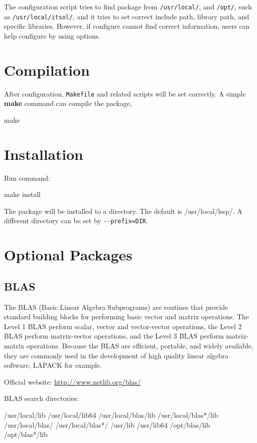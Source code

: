 The configuration script tries to find package from \verb|/usr/local/|, and \verb|/opt/|,
such as \verb|/usr/local/itsol/|, and it tries to set correct include path, library path, and 
specific libraries. However, if configure cannot find correct information, 
users can help configure by using options.

\section{Compilation}
After configuration, \verb|Makefile| and related scripts will be set correctly.
A simple {\color{blue}\textbf{make}} command can compile the package,

\begin{evb}
make
\end{evb}

\section{Installation}
Run command:
\begin{evb}
make install
\end{evb}
The package will be installed to a directory. The default is /usr/local/lssp/. 
A different directory can be set by \verb|--prefix=DIR|.

\section{Optional Packages}

\subsection{BLAS}
The BLAS (Basic Linear Algebra Subprograms) are routines that provide standard building blocks for performing basic vector and matrix operations. The Level 1 BLAS perform scalar, vector and vector-vector operations, the Level 2 BLAS perform matrix-vector operations, and the Level 3 BLAS perform matrix-matrix operations. Because the BLAS are efficient, portable, and widely available, they are commonly used in the development of high quality linear algebra software, LAPACK for example.

Official website: \url{http://www.netlib.org/blas/}

BLAS search directories:
\begin{evb}
/usr/local/lib
/usr/local/lib64
/usr/local/blas/lib
/usr/local/blas*/lib
/usr/local/blas/
/usr/local/blas*/
/usr/lib
/usr/lib64
/opt/blas/lib
/opt/blas*/lib
\end{evb}


